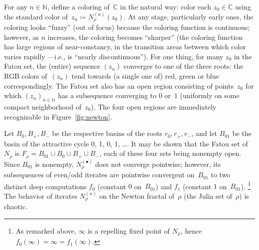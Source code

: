 For any $n\in \mathbb{N}$, define a coloring of~$\mathbb{C}$ in the natural way:
color each $z_0\in \mathbb{C}$ using the standard color of~$z_n\coloneqq N_{\rho}^{(n)}(z_0)$.
At any stage, particularly early ones, the coloring looks “fuzzy” (out of focus) because the coloring function is continuous;
however, as $n$ increases, the coloring becomes “sharper”
(the coloring function has large regions of near-constancy, in the transition areas between which color varies rapidly —i.e., is “nearly discontinuous”).
For one thing, for many $z_0$ in the Fatou set, the (entire) sequence $(z_n)$ converges to one of the three roots:
the RGB colors of~$(z_n)$ tend towards (a single one of) red, green or blue correspondingly.
The Fatou set also has an open region consisting of points~$z_0$ for which $(z_n)_{n\in \mathbb{N}}$ has a subsequence converging to $0$ or~$1$ (uniformly on some compact neighborhood of~$z_0$).
The four open regions are immediately recognizable in Figure~\ref{fig:newton}.

Let $B_0, B_+, B_-$ be the respective basins of the roots $r_0, r_+, r_-$, and let $B_{01}$ be the basin of the attractive cycle 0, 1, 0, 1, \dots.
It may be shown that the Fatou set of $N_\rho$ is $F_\rho = B_{01} \cup B_0 \cup B_{+} \cup B_{-}$, each of these four sets being nonempty open.
Since $B_{01}$ is nonempty, $N_\rho^{(\bullet)}$ does not converge pointwise; however, its subsequences of even/odd iterates are pointwise convergent on~$B_{01}$ to two distinct deep computations $f_0$ (constant $0$ on~$B_{01}$) and $f_1$ (constant $1$ on~$B_{01}$). \footnote{As remarked above, $\infty$ is a repelling fixed point of $N_\rho$, hence $f_0(\infty) = \infty = f_1(\infty)$.}
The behavior of iterates $N^{(n)}_\rho$ on the Newton fractal of~$\rho$ (the Julia set of~$\rho$) is chaotic.

